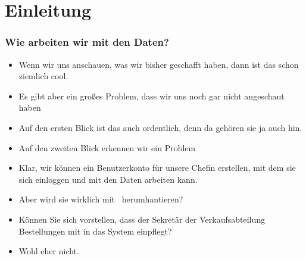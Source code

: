 \documentclass[aspectratio=169,mathserif,notheorems]{beamer}%
\subtitle{16.~Fabrik Datenbank:\\von Python auf PostgreSQL zugreifen}%
\begin{document}
%
%
%
%
\startPresentation%
%
\section{Einleitung}%
%
\begin{frame}%
\frametitle{Wie arbeiten wir mit den Daten?}%
\begin{itemize}%
\item Wenn wir uns anschauen, was wir bisher geschafft haben, dann ist das schon ziemlich cool.%
\item<2-> Es gibt aber ein großes Problem, dass wir uns noch gar nicht angeschaut haben%
\item<4-> Auf den ersten Blick ist das auch ordentlich, denn da gehören sie ja auch hin.%
\item<5-> Auf den zweiten Blick erkennen wir ein Problem%
\item<7-> Klar, wir können ein Benutzerkonto  für unsere Chefin erstellen, mit dem sie sich einloggen und mit den Daten arbeiten kann.%
\item<8-> Aber wird sie wirklich mit \sql\ herumhantieren?%
\item<9-> Können Sie sich vorstellen, dass der Sekretär der Verkaufsabteilung Bestellungen mit  in das System einpflegt?%
\item<10-> Wohl eher nicht.%
\end{itemize}%
\end{frame}%
%
\end{document}
